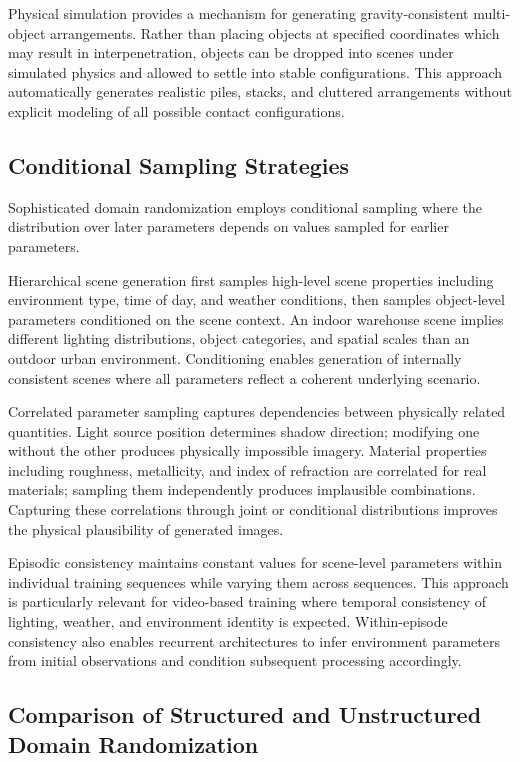 Physical simulation provides a mechanism for generating gravity-consistent multi-object arrangements. Rather than placing objects at specified coordinates which may result in interpenetration, objects can be dropped into scenes under simulated physics and allowed to settle into stable configurations. This approach automatically generates realistic piles, stacks, and cluttered arrangements without explicit modeling of all possible contact configurations.

\subsection{Conditional Sampling Strategies}

Sophisticated domain randomization employs conditional sampling where the distribution over later parameters depends on values sampled for earlier parameters.

Hierarchical scene generation first samples high-level scene properties including environment type, time of day, and weather conditions, then samples object-level parameters conditioned on the scene context. An indoor warehouse scene implies different lighting distributions, object categories, and spatial scales than an outdoor urban environment. Conditioning enables generation of internally consistent scenes where all parameters reflect a coherent underlying scenario.

Correlated parameter sampling captures dependencies between physically related quantities. Light source position determines shadow direction; modifying one without the other produces physically impossible imagery. Material properties including roughness, metallicity, and index of refraction are correlated for real materials; sampling them independently produces implausible combinations. Capturing these correlations through joint or conditional distributions improves the physical plausibility of generated images.

Episodic consistency maintains constant values for scene-level parameters within individual training sequences while varying them across sequences. This approach is particularly relevant for video-based training where temporal consistency of lighting, weather, and environment identity is expected. Within-episode consistency also enables recurrent architectures to infer environment parameters from initial observations and condition subsequent processing accordingly.

\subsection{Comparison of Structured and Unstructured Domain Randomization}

